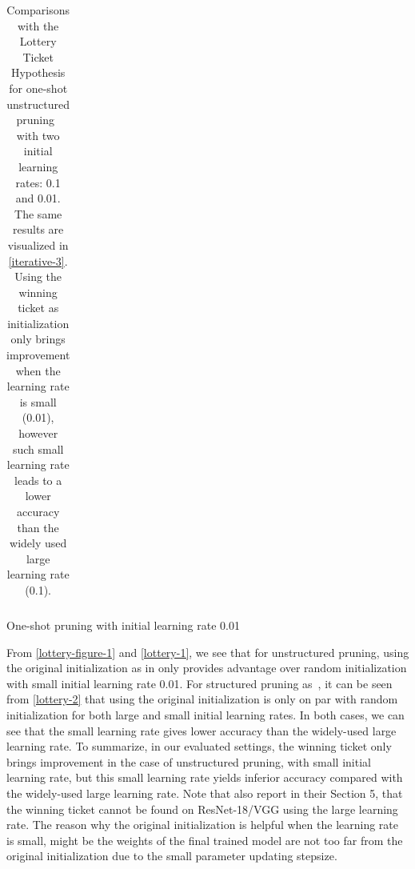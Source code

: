 \begin{table}[!htbp]
\begin{subtable}[b]{\textwidth}
\begin{tabular}{c|c|cccc}
\end{tabular}
\vspace{1ex}
\caption{One-shot pruning with initial learning rate 0.01}
\label{subtable-4}
\end{subtable}
\caption{Comparisons with the Lottery Ticket Hypothesis \citep{lottery} for one-shot unstructured  pruning~\citep{han2015learning} with two initial learning rates: 0.1 and 0.01. The same results are visualized in \autoref{iterative-3}. Using the winning ticket as initialization only brings improvement when the learning rate is small (0.01), however such small learning rate leads to a lower accuracy than the widely used large learning rate (0.1).}
\label{lottery-1}
\end{table}





From \autoref{lottery-figure-1} and \autoref{lottery-1}, we see that for unstructured  pruning, using the original initialization as in \citep{lottery} only provides advantage over random initialization with small initial learning rate 0.01. For structured pruning as~\citet{li2016pruning}, it can be seen from \autoref{lottery-2} that using the original initialization is only on par with random initialization for both large and small initial learning rates. In both cases, we can see that the small learning rate gives lower accuracy than the widely-used large learning rate. To summarize, in our evaluated settings, the winning ticket only brings improvement in the case of unstructured pruning, with small initial learning rate, but this small learning rate yields inferior accuracy compared with the widely-used large learning rate. Note that \cite{lottery} also report in their Section 5, that the winning ticket cannot be found on ResNet-18/VGG using the large learning rate. The reason why the original initialization is helpful when the learning rate is small, might be the weights of the final trained model are not too far from the original initialization due to the small parameter updating stepsize.

